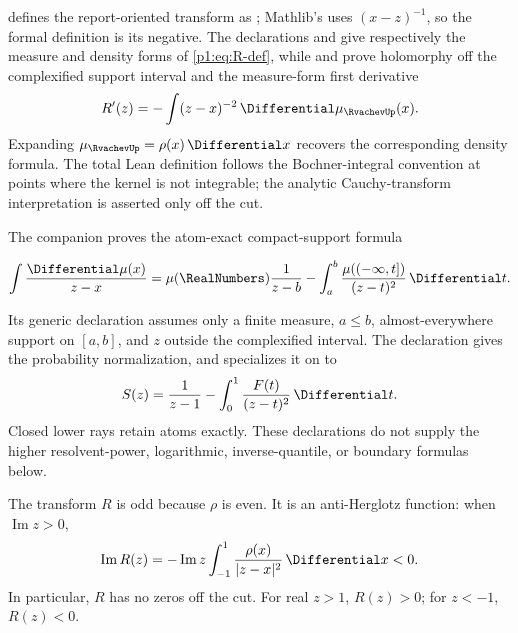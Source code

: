 \documentclass[11pt]{article}
\theoremstyle{definition}
\theoremstyle{remark}
\begin{document}
\begin{remark}
 defines the report-oriented transform as
; Mathlib's  uses
\((x-z)^{-1}\), so the formal definition is its negative.  The declarations
 and
 give respectively the
measure and density forms of \eqref{p1:eq:R-def}, while
 and
 prove holomorphy off the complexified
support interval and the measure-form first derivative
\[
 R'(z)=-\int (z-x)^{-2}\,\Differential\mu_{\RvachevUp}(x).
\]
Expanding \(\mu_{\RvachevUp}=\rho(x)\,\Differential x\) recovers the corresponding density formula.
The total Lean definition follows the Bochner-integral convention at points where the
kernel is not integrable; the analytic Cauchy-transform interpretation is asserted only
off the cut.

The companion  proves the atom-exact compact-support formula

\[
 \int\frac{\Differential\mu(x)}{z-x}
 =\mu(\RealNumbers)\frac1{z-b}
  -\int_a^b\frac{\mu((-\infty,t])}{(z-t)^2}\,\Differential t .
\]

Its generic declaration
assumes only a finite measure, \(a\leq b\), almost-everywhere support on
\([a,b]\), and \(z\) outside the complexified interval.  The declaration
 gives the probability
normalization, and
specializes it on  to
\[
 S(z)=\frac1{z-1}-\int_0^1\frac{F(t)}{(z-t)^2}\,\Differential t .
\]
Closed lower rays retain atoms exactly.  These declarations do not supply the
higher resolvent-power, logarithmic, inverse-quantile, or boundary formulas below.
\end{remark}

The transform \(R\) is odd because \(\rho\) is even.  It is an anti-Herglotz function:
when \(\operatorname{Im}z>0\),
\begin{equation}
 \operatorname{Im}R(z)
 =-\operatorname{Im}z\int_{-1}^{1}\frac{\rho(x)}{|z-x|^2}\,\Differential x<0. \label{p1:eq:R-anti-Herglotz}
\end{equation}
In particular, \(R\) has no zeros off the cut.  For real \(z>1\), \(R(z)>0\); for
\(z<-1\), \(R(z)<0\).
\end{document}
